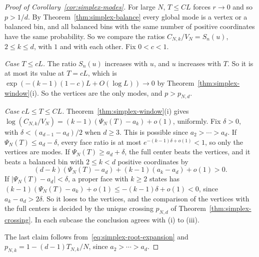 \begin{proof}[Proof of Corollary~\ref{cor:simplex-modes}]
For large $N$, $T\le CL$ forces $r\to0$ and so $p>1/d$. By
Theorem~\ref{thm:simplex-balance} every global mode is a vertex or a balanced
bin, and all balanced bins with the same number of positive coordinates have the
same probability. So we compare the ratios $C_{N,k}/V_N=S_n(u)$, $2\le k\le d$,
with $1$ and with each other. Fix $0<c<1$.

\emph{Case $T\le cL$.} The ratio $S_n(u)$ increases with $u$, and $u$ increases
with $T$. So it is at most its value at $T=cL$, which is
$\exp(-(k-1)(1-c)L+O(\log L))\to0$ by Theorem~\ref{thm:simplex-window}(i). So the
vertices are the only modes, and $p>p_{N,d}$.

\emph{Case $cL\le T\le CL$.} Theorem~\ref{thm:simplex-window}(i) gives
$\log(C_{N,k}/V_N)=(k-1)(\Psi_N(T)-a_k)+o(1)$, uniformly. Fix $\delta>0$, with
$\delta<(a_{d-1}-a_d)/2$ when $d\ge3$. This is possible since $a_2>\cdots>a_d$.
If $\Psi_N(T)\le a_d-\delta$, every face ratio is at most
$e^{-(k-1)\delta+o(1)}<1$, so only the vertices are modes. If
$\Psi_N(T)\ge a_d+\delta$, the full center beats the vertices, and it beats a
balanced bin with $2\le k<d$ positive coordinates by
\[
(d-k)(\Psi_N(T)-a_d)+(k-1)(a_k-a_d)+o(1)>0 .
\]
If $|\Psi_N(T)-a_d|<\delta$, a proper face with $k\ge2$ states has
$(k-1)(\Psi_N(T)-a_k)+o(1)\le-(k-1)\delta+o(1)<0$, since $a_k-a_d>2\delta$. So it
loses to the vertices, and the comparison of the vertices with the full centers
is decided by the unique crossing $p_{N,d}$ of Theorem~\ref{thm:simplex-crossing}.
In each subcase the conclusion agrees with (i) to (iii).

The last claim follows from~\eqref{eq:simplex-root-expansion} and
$p_{N,k}=1-(d-1)T_{N,k}/N$, since $a_2>\cdots>a_d$.
\end{proof}
